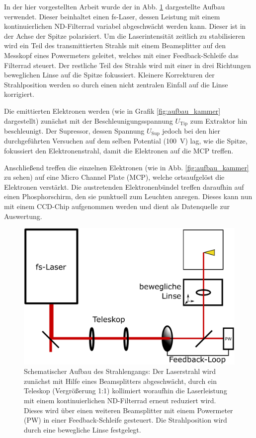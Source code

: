 \documentclass[bachelor,       %
               twoside,        %
               BCOR10mm,       %
               english,ngerman, %
               ]{GAUBM}
\begin{document}
In der hier vorgestellten Arbeit wurde der in Abb. \ref{fig:aufbau} dargestellte Aufbau verwendet.
Dieser beinhaltet einen fs-Laser, dessen Leistung mit einem kontinuierlichen ND-Filterrad variabel abgeschwächt werden kann.
Dieser ist in der Achse der Spitze polarisiert.
Um die Laserintensit\"at zeitlich zu stabilisieren wird ein Teil des transmittierten Strahls mit einem Beamsplitter auf den Messkopf eines Powermeters geleitet, welches mit einer Feedback-Schleife das Filterrad steuert.
Der restliche Teil des Strahls wird mit einer in drei Richtungen beweglichen Linse auf die Spitze fokussiert.
Kleinere Korrekturen der Strahlposition werden so durch einen nicht zentralen Einfall auf die Linse korrigiert.


Die emittierten Elektronen werden (wie in Grafik \ref{fig:aufbau_kammer} dargestellt) zunächst mit der Beschleunigungsspannung $U_\text{Tip}$ zum Extraktor hin beschleunigt.
Der Supressor, dessen Spannung $U_\text{Sup}$ jedoch bei den hier durchgeführten Versuchen auf dem selben Potential (\SI{100}{\V}) lag, wie die Spitze, fokussiert den Elektronenstrahl, damit die Elektronen auf die MCP treffen.\newline\newline

Anschließend treffen die einzelnen Elektronen (wie in Abb. \ref{fig:aufbau_kammer} zu sehen) auf eine Micro Channel Plate (MCP), welche ortsaufgelöst die Elektronen verstärkt.
Die austretenden Elektronenb\"undel treffen daraufhin auf einen Phosphorschirm, den sie punktuell zum Leuchten anregen.
Dieses kann nun mit einem CCD-Chip aufgenommen werden und dient als Datenquelle zur Auswertung.


\begin{figure}[h!]
	\centering
	\includegraphics[width=0.8\linewidth]{Aufbau2}
	\caption{Schematischer Aufbau des Strahlengangs: Der Laserstrahl wird zunächst mit Hilfe eines Beamsplitters abgeschwächt, durch ein Teleskop (Vergrößerung 1:1)  kollimiert woraufhin die Laserleistung mit einem kontinuierlichen ND-Filterrad erneut reduziert wird. Dieses wird über einen weiteren Beamsplitter mit einem Powermeter (PW) in einer Feedback-Schleife gesteuert. Die Strahlposition wird durch eine bewegliche Linse festgelegt.}
	\label{fig:aufbau}
\end{figure}
\end{document}
